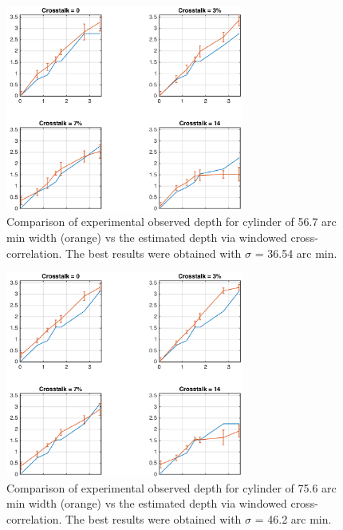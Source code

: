 \begin{figure}[H]
\centering
    \includegraphics[width=0.7\textwidth]{./Template_Figures/s_27_sigma_17_4}
    \caption{Comparison of experimental observed depth for cylinder of 56.7 arc min width (orange) vs the estimated depth via windowed cross-correlation. The best results were obtained with $\sigma$ = 36.54 arc min.\label{fig:s_27_sigma_17_4}}
\end{figure}
\begin{figure}[H]
\centering
    \includegraphics[width=0.7\textwidth]{./Template_Figures/s_36_sigma_22}
    \caption{Comparison of experimental observed depth for cylinder of 75.6 arc min width (orange) vs the estimated depth via windowed cross-correlation. The best results were obtained with $\sigma$ = 46.2 arc min.\label{fig:s_36_sigma_22}}
\end{figure}

